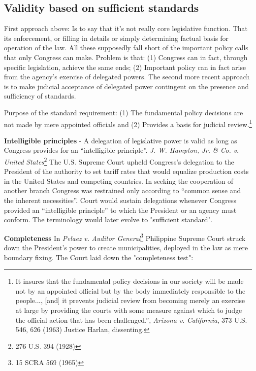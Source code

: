 \documentclass[../main.tex]{subfiles}
\begin{document}
\subsection{Validity based on sufficient standards}

First approach above: Is to say that it's not really core legislative function. That its enforcement, or filling in details or simply determining factual basis for operation of the law. All these supposedly fall short of the important policy calls that only Congress can make. Problem is that: (1) Congress can in fact, through specific legislation, achieve the same ends; (2) Important policy can in fact arise from the agency's exercise of delegated powers. The  second more recent approach is to make judicial acceptance of delegated power contingent on the presence and sufficiency of standards. 

Purpose of the standard requirement: (1) The fundamental policy decisions are not made by mere appointed officials and (2) Provides a basis for judicial review.\footnote{It insures that the fundamental policy decisions in our society will be made not by an appointed official but by the body immediately responsible to the people..., [and] it prevents judicial review from becoming merely an exercise at large by providing the courts with some measure against which to judge the official action that has been challenged.”, \textit{Arizona v. California}, 373 U.S. 546, 626 (1963) Justice Harlan, dissenting.}


\textbf{Intelligible principles} - A delegation of legislative power is valid as long as Congress provides for an ``intelligible principle''. \textit{J. W. Hampton, Jr. \& Co. v. United States}\footnote{276 U.S. 394 (1928)} The U.S. Supreme Court upheld Congress’s delegation to the President of the authority to set tariff rates that would equalize production costs in the United States and competing countries.  In seeking the cooperation of another branch Congress was restrained only according to “common sense and the inherent necessities”. Court would sustain delegations whenever Congress provided an “intelligible principle” to which the President or an agency must conform. The terminology would later evolve to "sufficient standard".

\textbf{Completeness} In \textit{Pelaez v. Auditor General}\footnote{15 SCRA 569 (1965)} Philippine Supreme Court struck down the President's power to create municipalities, deployed in the law as mere boundary fixing. The Court laid down the "completeness test":
\end{document}
